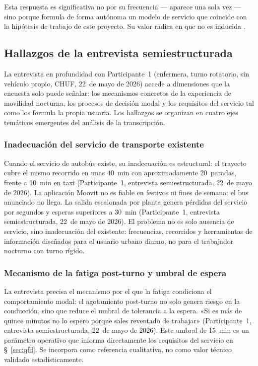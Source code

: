 Esta respuesta es significativa no por su frecuencia --- aparece una sola vez --- sino porque formula de forma autónoma un modelo de servicio que coincide con la hipótesis de trabajo de este proyecto. Su valor radica en que no es inducida \parencite{LouridoRegueira2026}.

\subsection{Hallazgos de la entrevista semiestructurada}
\label{sec:hallazgos-entrevista}

La entrevista en profundidad con Participante~1 (enfermera, turno rotatorio, sin vehículo propio, \acs{CHUF}, 22~de mayo de 2026) accede a dimensiones que la encuesta solo puede señalar: los mecanismos concretos de la experiencia de movilidad nocturna, los procesos de decisión modal y los requisitos del servicio tal como los formula la propia usuaria. Los hallazgos se organizan en cuatro ejes temáticos emergentes del análisis de la transcripción.

\subsubsection{Inadecuación del servicio de transporte existente}
\label{sec:inadecuacion-tp}

Cuando el servicio de autobús existe, su inadecuación es estructural: el trayecto cubre el mismo recorrido en unas 40~min con aproximadamente 20~paradas, frente a 10~min en taxi (Participante~1, entrevista semiestructurada, 22~de mayo de 2026). La aplicación Moovit no es fiable en festivos ni fines de semana: el bus anunciado no llega. La salida escalonada por planta genera pérdidas del servicio por segundos y esperas superiores a 30~min (Participante~1, entrevista semiestructurada, 22~de mayo de 2026). El problema no es solo ausencia de servicio, sino inadecuación del existente: frecuencias, recorridos y herramientas de información diseñados para el usuario urbano diurno, no para el trabajador nocturno con turno rígido.

\subsubsection{Mecanismo de la fatiga post-turno y umbral de espera}
\label{sec:fatiga-mecanismo}

La entrevista precisa el mecanismo por el que la fatiga condiciona el comportamiento modal: el agotamiento post-turno no solo genera riesgo en la conducción, sino que reduce el umbral de tolerancia a la espera. «Si es más de quince minutos no lo espero porque sales reventado de trabajar» (Participante~1, entrevista semiestructurada, 22~de mayo de 2026). Este umbral de 15~min es un parámetro operativo que informa directamente los requisitos del servicio en §~\ref{sec:qfd}. Se incorpora como referencia cualitativa, no como valor técnico validado estadísticamente.

